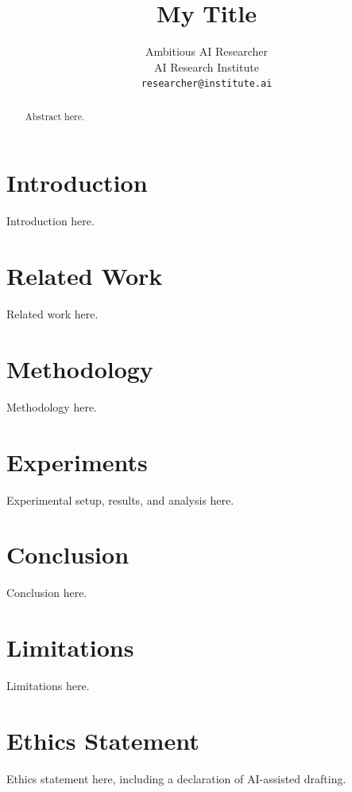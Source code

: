 \documentclass[11pt]{article}
\title{My Title}
\author{Ambitious AI Researcher \\
  AI Research Institute \\
  \texttt{researcher@institute.ai}}
\begin{document}
\maketitle

\begin{abstract}
Abstract here.
\end{abstract}

\section{Introduction}
\label{sec:intro}
Introduction here.

\section{Related Work}
\label{sec:related_work}
Related work here.

\section{Methodology}
\label{sec:method}
Methodology here.

\section{Experiments}
\label{sec:experiments}
Experimental setup, results, and analysis here.

\section{Conclusion}
\label{sec:conclusion}
Conclusion here.

\section*{Limitations}
Limitations here.

\section*{Ethics Statement}
Ethics statement here, including a declaration of AI-assisted drafting.




\end{document}
